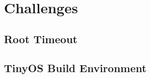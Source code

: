 \documentclass[Main]{subfiles}
\begin{document}
\section{Challenges} %
\label{sec:challenges}

	\subsection{Root Timeout} %
	\label{sub:root_timeout}
		

	\subsection{TinyOS Build Environment} %
	\label{sub:tinyos_build_environment}
		

\end{document}
